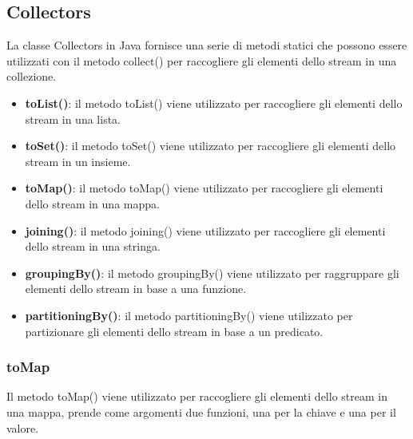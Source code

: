 \documentclass[11pt]{article}
\begin{document}
\subsection{Collectors}
La classe Collectors in Java fornisce una serie di metodi statici che possono essere utilizzati con il metodo collect() per raccogliere gli elementi dello stream in una collezione.
\begin{itemize}
    \item \textbf{toList()}: il metodo toList() viene utilizzato per raccogliere gli elementi dello stream in una lista.
    \item \textbf{toSet()}: il metodo toSet() viene utilizzato per raccogliere gli elementi dello stream in un insieme.
    \item \textbf{toMap()}: il metodo toMap() viene utilizzato per raccogliere gli elementi dello stream in una mappa.
    \item \textbf{joining()}: il metodo joining() viene utilizzato per raccogliere gli elementi dello stream in una stringa.
    \item \textbf{groupingBy()}: il metodo groupingBy() viene utilizzato per raggruppare gli elementi dello stream in base a una funzione.
    \item \textbf{partitioningBy()}: il metodo partitioningBy() viene utilizzato per partizionare gli elementi dello stream in base a un predicato.
    \end{itemize}
\subsubsection{toMap}
Il metodo toMap() viene utilizzato per raccogliere gli elementi dello stream in una mappa, prende come argomenti due funzioni, una per la chiave e una per il valore.
\end{document}
